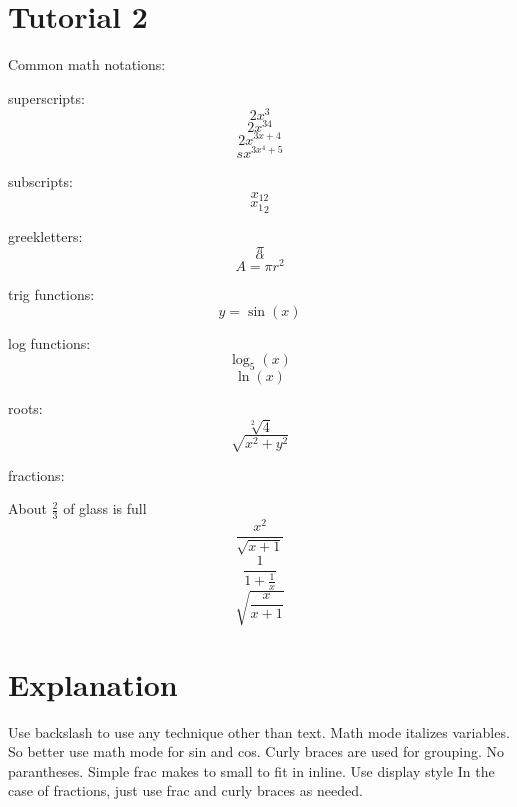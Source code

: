 \documentclass[11pt]{article}
\begin{document}
\section*{Tutorial 2}
Common math notations:

superscripts:
$$2x^3$$ 
$$2x^{34}$$
$$2x^{3x+4} $$
$$sx^{3x^4+5}$$

subscripts:
$$x_{12}$$
$${x_1}_2$$

greekletters:
$$\pi$$
$$\alpha$$
$$ A= \pi r^2$$

trig functions:
$$y=\sin(x)$$

log functions:
$$\log_5(x)$$
$$\ln(x)$$

roots:
$$\sqrt[2]{4}$$
$$\sqrt{x^2+y^2}$$

fractions:

About $\displaystyle{\frac{2}{3}}$ of glass is full
$$\frac{x^2}{\sqrt{x+1}}$$
$$\frac{1}{1+\frac{1}{x}}$$
$$\sqrt{\frac{x}{x+1}}$$

\section*{Explanation}
Use backslash to use any technique other than text.
Math mode italizes variables. So better use math mode for sin and cos.
Curly braces are used for grouping. No parantheses.
Simple frac makes to small to fit in inline. Use display style
In the case of fractions, just use frac and curly braces as needed.
\end{document}
